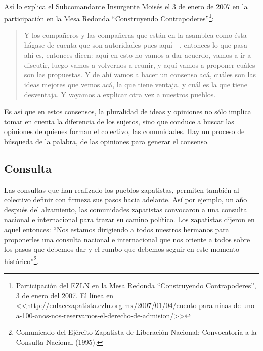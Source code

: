 \documentclass[oneside]{book}
\begin{document}
Así lo explica el Subcomandante Insurgente Moisés el 3 de enero de 2007 en la participación en la Mesa Redonda “Construyendo Contrapoderes”\footnote{Participación del EZLN en la Mesa Redonda “Construyendo Contrapoderes”, 3 de enero del 2007. El línea en <<http://enlacezapatista.ezln.org.mx/2007/01/04/cuento-para-ninas-de-uno-a-100-anos-nos-reservamos-el-derecho-de-admision/>>}:
\begin{quote}
Y los compañeros y las compañeras que están en la asamblea como ésta —hágase de cuenta que son autoridades pues aquí—, entonces lo que pasa ahí es, entonces dicen: aquí en esto no vamos a dar acuerdo, vamos a ir a discutir, luego vamos a volvernos a reunir, y aquí vamos a proponer cuáles son las propuestas. Y de ahí vamos a hacer un consenso acá, cuáles son las ideas mejores que vemos acá, la que tiene ventaja, y cuál es la que tiene desventaja. Y vayamos a explicar otra vez a nuestros pueblos.
\end{quote}

Es así que en estos consensos, la pluralidad de ideas y opiniones no sólo implica tomar en cuenta la diferencia de los sujetos, sino que conduce a buscar las opiniones de quienes forman el colectivo, las comunidades. Hay un proceso de búsqueda de la palabra, de las opiniones para generar el consenso.

\subsection{Consulta}
	
Las consultas que han realizado los pueblos zapatistas, permiten también al colectivo definir con firmeza sus pasos hacia adelante. Así por ejemplo, un año después del alzamiento, las comunidades zapatistas convocaron a una consulta nacional e internacional para trazar su camino político. Los zapatistas dijeron en aquel entonces: “Nos estamos dirigiendo a todos nuestros hermanos para proponerles una consulta nacional e internacional que nos oriente a todos sobre los pasos que debemos dar y el rumbo que debemos seguir en este momento histórico”\footnote{Comunicado del Ejército Zapatista de Liberación Nacional: Convocatoria a la Consulta Nacional (1995).}.
\end{document}

